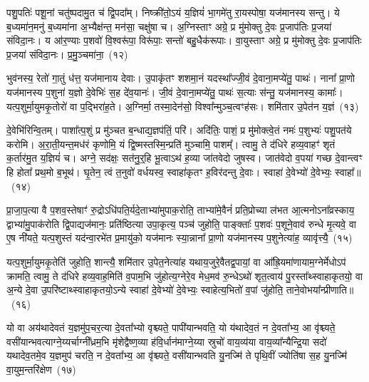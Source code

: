 पशु॒पतिः॑ पशू॒नां चतु॑ष्पदामु॒त च॑ द्वि॒पदा᳚म्। निष्क्री॑तो॒\-ऽयं य॒ज्ञियं॑ भा॒गमे॑तु रा॒यस्पोषा॒ यज॑मानस्य सन्तु। ये ब॒ध्यमा॑न॒मनु॑ ब॒ध्यमा॑ना अ॒भ्यैक्ष॑न्त॒ मन॑सा॒ चक्षु॑षा च। अ॒ग्निस्ताꣳ अग्रे॒ प्र मु॑मोक्तु दे॒वः प्र॒जा\-प॑तिः प्र॒जया॑ संविदा॒नः। य आ॑र॒ण्याः प॒शवो॑ वि॒श्वरू॑पा॒ विरू॑पाः॒ सन्तो॑ बहु॒धैक॑रूपाः। वा॒युस्ताꣳ अग्रे॒ प्र मु॑मोक्तु दे॒वः प्र॒जा\-प॑तिः प्र॒जया॑ संविदा॒नः। प्र॒मु॒ञ्चमा॑ना॒~(१२)\ip

भुव॑नस्य॒ रेतो॑ गा॒तुं ध॑त्त॒ यज॑मानाय देवाः। उ॒पाकृ॑तꣳ शशमा॒नं यदस्था᳚ज्जी॒वं दे॒वाना॒मप्ये॑तु॒ पाथः॑। नाना᳚ प्रा॒णो यज॑मानस्य प॒शुना॑ य॒ज्ञो दे॒वेभिः॑ स॒ह दे॑व॒यानः॑। जी॒वं दे॒वाना॒मप्ये॑तु॒ पाथः॑ स॒त्याः स॑न्तु॒ यज॑मानस्य॒ कामाः᳚। यत्प॒शुर्मा॒युमकृ॒तोरो॑ वा प॒द्भिरा॑ह॒ते। अ॒ग्निर्मा॒ तस्मा॒देन॑सो॒ विश्वा᳚न्मुञ्च॒त्वꣳह॑सः। शमि॑तार उ॒पेत॑न य॒ज्ञं~(१३)\ip

दे॒वेभि॑रिन्वि॒तम्। पाशा᳚त्प॒शुं प्र मु॑ञ्चत ब॒न्धाद्य॒ज्ञप॑तिं॒ परि॑। अदि॑तिः॒ पाशं॒ प्र मु॑मोक्त्वे॒तं नमः॑ प॒शुभ्यः॑ पशु॒पत॑ये करोमि। अ॒रा॒ती॒यन्त॒मध॑रं कृणोमि॒ यं द्वि॒ष्मस्तस्मि॒न्प्रति॑ मुञ्चामि॒ पाशम्᳚। त्वामु॒ ते द॑धिरे हव्य॒वाहꣳ॑ शृतं क॒र्तार॑मु॒त य॒ज्ञियं॑ च। अग्ने॒ सद॑क्षः॒ सत॑नु॒र्॒\mbox{}हि भू॒त्वा\-ऽथ॑ ह॒व्या जा॑तवेदो जुषस्व। जात॑वेदो व॒पया॑ गच्छ दे॒वान्त्वꣳ हि होता᳚ प्रथ॒मो ब॒भूथ॑। घृ॒तेन॒ त्वं त॒नुवो॑ वर्धयस्व॒ स्वाहा॑कृतꣳ ह॒विर॑दन्तु दे॒वाः। स्वाहा॑ दे॒वेभ्यो॑ दे॒वेभ्यः॒ स्वाहा᳚॥~(१४)\ip

{\anuvakamend[{ईशे᳚ प्रमु॒ञ्चमा॑ना य॒ज्ञन्त्वꣳ षोड॑श च}]}

प्रा॒जा॒प॒त्या वै प॒शव॒स्तेषाꣳ॑ रु॒द्रो\-ऽधि॑\-पति॒र्यदे॒ताभ्या॑मुपाक॒रोति॒ ताभ्या॑मे॒वैनं॑ प्रति॒प्रोच्या ल॑भत आ॒त्मनो\-ऽना᳚व्रस्काय॒ द्वाभ्या॑मु॒पा\-क॑रोति द्वि॒पाद्यज॑मानः॒ प्रति॑ष्ठित्या उपा॒कृत्य॒ पञ्च॑ जुहोति॒ पाङ्क्ताः᳚ प॒शवः॑ प॒शूने॒वाव॑ रुन्धे मृ॒त्यवे॒ वा ए॒ष नी॑यते॒ यत्प॒शुस्तं यद॑न्वा॒रभे॑त प्र॒मायु॑को॒ यज॑मानः स्या॒न्नाना᳚ प्रा॒णो यज॑मानस्य प॒शुनेत्या॑ह॒ व्यावृ॑त्त्यै॒~(१५)\ip

यत्प॒शुर्मा॒युमकृ॒तेति॑ जुहोति॒ शान्त्यै॒ शमि॑तार उ॒पेत॒नेत्या॑ह यथाय॒जुरे॒वैतद्व॒पायां॒ वा आ᳚ह्रि॒यमा॑णायाम॒ग्नेर्मेधो\-ऽप॑ क्रामति॒ त्वामु॒ ते द॑धिरे हव्य॒वाह॒मिति॑ व॒पाम॒भि जु॑होत्य॒ग्नेरे॒व मेध॒मव॑ रु॒न्धे\-ऽथो॑ शृत॒त्वाय॑ पु॒रस्ता᳚थ्\-स्वाहाकृतयो॒ वा अ॒न्ये दे॒वा उ॒परि॑ष्टाथ्\-स्वाहाकृतयो॒\-ऽन्ये स्वाहा॑ दे॒वेभ्यो॑ दे॒वेभ्यः॒ स्वाहेत्य॒भितो॑ व॒पां जु॑होति॒ ताने॒वोभया᳚न्प्रीणाति॥~(१६)\ip

{\anuvakamend[{व्यावृ॑त्त्या अ॒भितो॑ व॒पां पञ्च॑ च}]}

यो वा अय॑थादेवतं य॒ज्ञमु॑प॒चर॒त्या दे॒वता᳚भ्यो वृश्च्यते॒ पापी॑यान्भवति॒ यो य॑थादेव॒तं न दे॒वता᳚भ्य॒ आ वृ॑श्च्यते॒ वसी॑यान्भवत्याग्ने॒य्यर्चाग्नी᳚ध्रम॒भि मृ॑शेद्वैष्ण॒व्या ह॑वि॒र्धान॑माग्ने॒य्या स्रुचो॑ वाय॒व्य॑या वाय॒व्या᳚न्यैन्द्रि॒या सदो॑ यथादेव॒तमे॒व य॒ज्ञमुप॑ चरति॒ न दे॒वता᳚भ्य॒ आ वृ॑श्च्यते॒ वसी॑यान्भवति यु॒नज्मि॑ ते पृथि॒वीं ज्योति॑षा स॒ह यु॒नज्मि॑ वा॒युम॒न्तरि॑क्षेण~(१७)\ip

